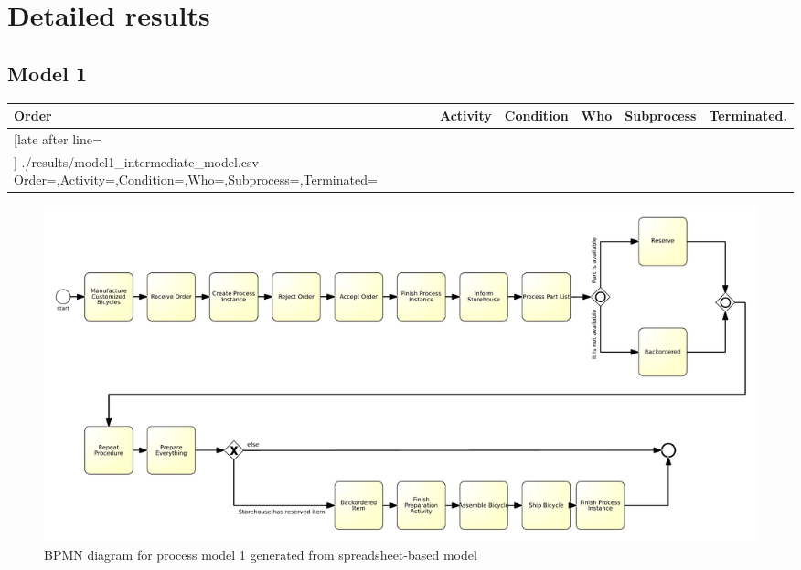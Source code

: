 \chapter{Detailed results}
\label{cha:detailed-results}
\section{Model 1}
\begin{tcolorbox}[
	breakable,
	arc=0mm,
	left=1pt,
	right = 1pt,
	boxrule=0mm,
	colback = {white},
	]
	\texttt{}
\end{tcolorbox}
\label{txt:model1}

{\scriptsize
	\begin{longtable}{|p{0.03 \hsize}|p{0.25 \hsize}|p{0.15 \hsize}|p{0.2 \hsize}|p{0.1 \hsize}|p{0.1 \hsize}|}
		\hline
		Order & Activity & Condition & Who & Subprocess & Terminated.
		\\\hline\hline
		\csvreader[late after line=\\\hline]
		{./results/model1_intermediate_model.csv}
		{Order=\Order,Activity=\Activity,Condition=\Condition,Who=\Who,Subprocess=\Subprocess,Terminated=\Terminated}
		{\Order & \Activity & \Condition & \Who & \Subprocess & \Terminated}
		\caption{Spreadsheet-based description for process model 1}
		\label{csv:model1}
	\end{longtable}
}

\begin{figure}[H]
	\centering
	\includegraphics[width=\hsize]{./generated_bpmn/model1.pdf}
	\caption{BPMN diagram for process model 1 generated from spreadsheet-based model}
	\label{bpmn:generated_model1}
\end{figure}

